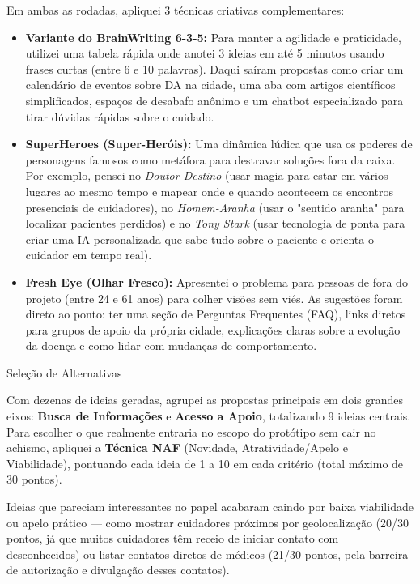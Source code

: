 \documentclass[11pt,a4paper]{article}
\newcommand{\subtituloSecao}[1]{%
  \par\addvspace{10pt}%
  {\noindent\fontsize{16pt}{20pt}\selectfont\normalfont\color{headingBlue}#1\par}%
  \vspace{3pt}%
}
\begin{document}
Em ambas as rodadas, apliquei 3 técnicas criativas complementares:

\begin{itemize}[leftmargin=1.25cm, label=\textbullet, topsep=2pt, itemsep=6pt]
  \item \textbf{Variante do BrainWriting 6-3-5:} Para manter a agilidade e praticidade, utilizei uma tabela rápida onde anotei 3 ideias em até 5 minutos usando frases curtas (entre 6 e 10 palavras). Daqui saíram propostas como criar um calendário de eventos sobre DA na cidade, uma aba com artigos científicos simplificados, espaços de desabafo anônimo e um chatbot especializado para tirar dúvidas rápidas sobre o cuidado.
  \item \textbf{SuperHeroes (Super-Heróis):} Uma dinâmica lúdica que usa os poderes de personagens famosos como metáfora para destravar soluções fora da caixa. Por exemplo, pensei no \textit{Doutor Destino} (usar magia para estar em vários lugares ao mesmo tempo e mapear onde e quando acontecem os encontros presenciais de cuidadores), no \textit{Homem-Aranha} (usar o "sentido aranha" para localizar pacientes perdidos) e no \textit{Tony Stark} (usar tecnologia de ponta para criar uma IA personalizada que sabe tudo sobre o paciente e orienta o cuidador em tempo real).
  \item \textbf{Fresh Eye (Olhar Fresco):} Apresentei o problema para pessoas de fora do projeto (entre 24 e 61 anos) para colher visões sem viés. As sugestões foram direto ao ponto: ter uma seção de Perguntas Frequentes (FAQ), links diretos para grupos de apoio da própria cidade, explicações claras sobre a evolução da doença e como lidar com mudanças de comportamento.
\end{itemize}

\subtituloSecao{Seleção de Alternativas}

Com dezenas de ideias geradas, agrupei as propostas principais em dois grandes eixos: \textbf{Busca de Informações} e \textbf{Acesso a Apoio}, totalizando 9 ideias centrais. Para escolher o que realmente entraria no escopo do protótipo sem cair no achismo, apliquei a \textbf{Técnica NAF} (Novidade, Atratividade/Apelo e Viabilidade), pontuando cada ideia de 1 a 10 em cada critério (total máximo de 30 pontos).

\hspace*{1.25cm}Ideias que pareciam interessantes no papel acabaram caindo por baixa viabilidade ou apelo prático — como mostrar cuidadores próximos por geolocalização (20/30 pontos, já que muitos cuidadores têm receio de iniciar contato com desconhecidos) ou listar contatos diretos de médicos (21/30 pontos, pela barreira de autorização e divulgação desses contatos).
\end{document}
